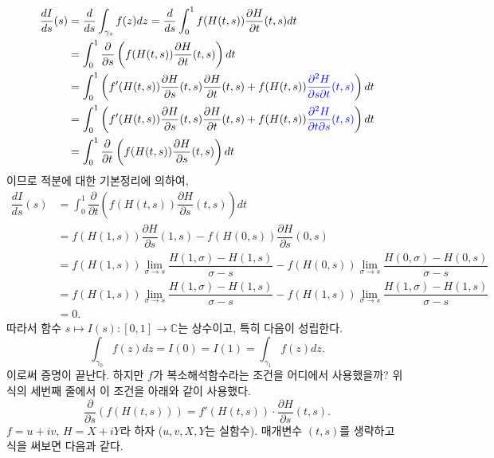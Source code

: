 \begin{align*}
\dfrac{dI}{ds}(s)
&= \dfrac d{ds} \int_{\gamma_s} f(z)dz 
= \dfrac d{ds} \int_0^1 f(H(t,s))\dfrac{\partial H}{\partial t}(t,s)dt \\
&= \int_0^1 \dfrac{\partial}{\partial s} \left( f(H(t,s))\dfrac{\partial H}{\partial t}(t,s) \right) dt \\
&= \int_0^1 \left(  f'(H(t,s))\dfrac{\partial H}{\partial s}(t,s)\dfrac{\partial H}{\partial t}(t,s)
+ f(H(t,s)) \textcolor{blue}{\dfrac{\partial^2H}{\partial s\partial t}(t,s)} \right) dt \\
&= \int_0^1 \left(  f'(H(t,s))\dfrac{\partial H}{\partial s}(t,s)\dfrac{\partial H}{\partial t}(t,s)
+ f(H(t,s)) \textcolor{blue}{\dfrac{\partial^2H}{\partial t\partial s}(t,s)} \right) dt \\
&= \int_0^1 \dfrac \partial{\partial t} \left( f(H(t,s)) \dfrac{\partial H}{\partial s}(t,s) \right) dt
\end{align*}
이므로 적분에 대한 기본정리에 의하여,
\begin{align*}
\dfrac{dI}{ds}(s)
&= \int_0^1 \dfrac \partial{\partial t} \left( f(H(t,s)) \dfrac{\partial H}{\partial s}(t,s) \right) dt \\
&= f(H(1,s))  \dfrac{\partial H}{\partial s}(1,s) - f(H(0,s)) \dfrac{\partial H}{\partial s}(0,s) \\
&= f(H(1,s)) \lim_{\sigma\to s} \dfrac{H(1,\sigma) - H(1,s)}{\sigma - s}
- f(H(0,s)) \lim_{\sigma\to s} \dfrac{H(0,\sigma) - H(0,s)}{\sigma - s} \\
&= f(H(1,s)) \lim_{\sigma\to s} \dfrac{H(1,\sigma) - H(1,s)}{\sigma - s}
- f(H(1,s)) \lim_{\sigma\to s} \dfrac{H(1,\sigma) - H(1,s)}{\sigma - s} \\
&=0.
\end{align*}
따라서 함수 $s\mapsto I(s): [0,1] \to \mathbb C$는 상수이고, 특히
다음이 성립한다.
\[
\int_{\gamma_0} f(z)dz = I(0) = I(1) = \int_{\gamma_1} f(z)dz.
\]
이로써 증명이 끝난다. 하지만 $f$가 복소해석함수라는 조건을 어디에서 사용했을까?
위 식의 세번째 줄에서 이 조건을 아래와 같이 사용했다.
\[
\dfrac\partial{\partial s}(f(H(t,s))) = f'(H(t,s))\cdot \dfrac{\partial H}{\partial s}(t,s).
\]
$f=u+iv$, $H=X+iY$라 하자 ($u,v,X,Y$는 실함수).
매개변수 $(t,s)$를 생략하고 식을 써보면 다음과 같다.
